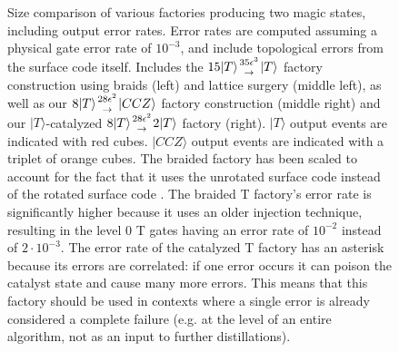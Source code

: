 \documentclass[superscriptaddress,notitlepage,longbibliography]{revtex4-1}
\newcommand{\factory}[3]{$#1 \genfrac{}{}{0pt}{}{#2}{\rightarrow} {#3}$ factory}
\begin{document}
\begin{figure}[ht]
  \label{fig:overview-3d}
  \caption{
    Size comparison of various factories producing two magic states, including output error rates.
    Error rates are computed assuming a physical gate error rate of $10^{-3}$, and include topological errors from the surface code itself.
    Includes the \factory{15|T\rangle}{35 \epsilon^3}{|T\rangle} construction using braids \cite{fowler2012bridge} (left) and lattice surgery \cite{fowler2018} (middle left), as well as our \factory{8|T\rangle}{28\epsilon^2}{|CCZ\rangle} construction (middle right) and our $|T\rangle$-catalyzed \factory{8|T\rangle}{28\epsilon^2}{2|T\rangle} (right).
    $|T\rangle$ output events are indicated with red cubes.
    $|CCZ\rangle$ output events are indicated with a triplet of orange cubes.
    The braided factory has been scaled to account for the fact that it uses the unrotated surface code instead of the rotated surface code \cite{horsman2012}.
    The braided T factory's error rate is significantly higher because it uses an older injection technique, resulting in the level 0 T gates having an error rate of $10^{-2}$ instead of $2 \cdot 10^{-3}$.
    The error rate of the catalyzed T factory has an asterisk because its errors are correlated: if one error occurs it can poison the catalyst state and cause many more errors.
    This means that this factory should be used in contexts where a single error is already considered a complete failure (e.g. at the level of an entire algorithm, not as an input to further distillations).
  }
\end{figure}
\end{document}
